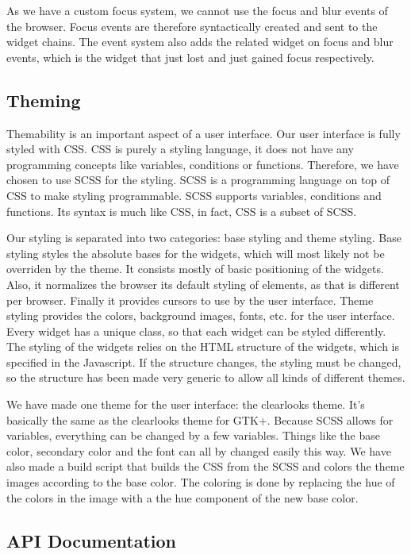 \documentclass[11pt,a4paper]{article}
\begin{document}
As we have a custom focus system, we cannot use the focus and blur events of the browser.
Focus events are therefore syntactically created and sent to the widget chains.
The event system also adds the related widget on focus and blur events, which is the widget that just lost and just gained focus respectively.

\subsection{Theming}

Themability is an important aspect of a user interface.
Our user interface is fully styled with CSS.
CSS is purely a styling language, it does not have any programming concepts like variables, conditions or functions.
Therefore, we have chosen to use SCSS for the styling.
SCSS is a programming language on top of CSS to make styling programmable.
SCSS supports variables, conditions and functions.
Its syntax is much like CSS, in fact, CSS is a subset of SCSS.

Our styling is separated into two categories: base styling and theme styling.
Base styling styles the absolute bases for the widgets, which will most likely not be overriden by the theme.
It consists mostly of basic positioning of the widgets.
Also, it normalizes the browser its default styling of elements, as that is different per browser.
Finally it provides cursors to use by the user interface.
Theme styling provides the colors, background images, fonts, etc. for the user interface.
Every widget has a unique class, so that each widget can be styled differently.
The styling of the widgets relies on the HTML structure of the widgets, which is specified in the Javascript.
If the structure changes, the styling must be changed, so the structure has been made very generic to allow all kinds of different themes.

We have made one theme for the user interface: the clearlooks theme.
It's basically the same as the clearlooks theme for GTK+.
Because SCSS allows for variables, everything can be changed by a few variables.
Things like the base color, secondary color and the font can all by changed easily this way.
We have also made a build script that builds the CSS from the SCSS and colors the theme images according to the base color.
The coloring is done by replacing the hue of the colors in the image with a the hue component of the new base color.

\subsection{API Documentation}
\end{document}
